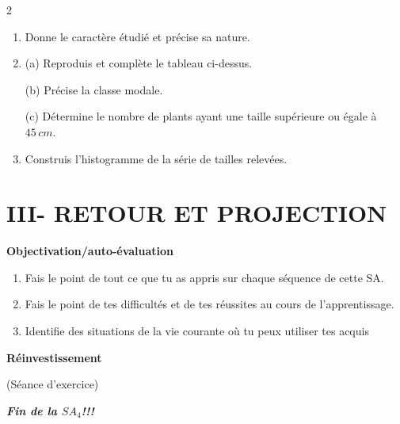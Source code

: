 \begin{multicols*}{2}
 \begin{enumerate}
 	\item Donne le caractère étudié et précise sa nature.
 	\item[2.] (a) Reproduis et complète le tableau ci-dessus.
 	
 	(b) Précise la classe modale.
 	
 	(c) Détermine le nombre de plants ayant une taille supérieure ou égale à $45\,cm$.
 	\item Construis l'histogramme de la série de tailles relevées.
 \end{enumerate}
 
 	\section*{III- RETOUR ET PROJECTION}
 	 \textbf{Objectivation/auto-évaluation}
 	
 	\begin{enumerate}
 		\item  Fais le point de tout ce que tu as appris sur chaque séquence de cette SA. 
 		\item  Fais le point de tes difficultés et de tes réussites au cours de l'apprentissage.
 		\item  Identifie des situations de la vie courante où tu peux utiliser tes acquis
 	\end{enumerate}
 	 \textbf{Réinvestissement}
 	
 	(Séance d'exercice)
 	
 	\begin{center}
 		\it\textit{\textbf{Fin de la $SA_{4} $!!!}}
 	\end{center}
 \end{multicols*}
 
 